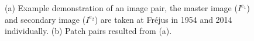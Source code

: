 \begin{figure}[htbp]
	\begin{center}
		\caption{(a) Example demonstration of an image pair, the master image ($I^{e_1}$) and secondary image ($I^{e_2}$) are taken at Fr{\'e}jus in 1954 and 2014 individually. (b) Patch pairs resulted from (a).}
		\label{WorkflowPatch}
	\end{center}
\end{figure}

